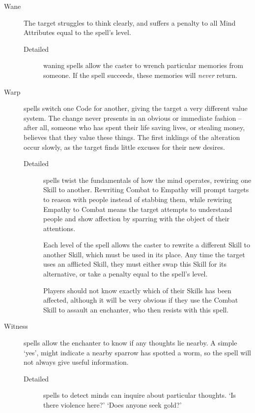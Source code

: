 \begin{multicols}{2}
\begin{description}
  \item[Wane]
    The target struggles to think clearly, and suffers a penalty to all Mind Attributes equal to the spell's level.
    \begin{description}
      \item[Detailed]
        waning spells allow the caster to wrench particular memories from someone.
        If the spell succeeds, these memories will \emph{never} return.
    \end{description}
  \item[Warp]
    spells switch one Code for another, giving the target a very different value system.
    The change never presents in an obvious or immediate fashion -- after all, someone who has spent their life saving lives, or stealing money, believes that they value these things.
    The first inklings of the alteration occur slowly, as the target finds little excuses for their new desires.
    \begin{description}
      \item[Detailed]
        spells twist the fundamentals of how the mind operates, rewiring one Skill to another.
        Rewriting Combat to Empathy will prompt targets to reason with people instead of stabbing them, while rewiring Empathy to Combat means the target attempts to understand people and show affection by sparring with the object of their attentions.

        Each level of the spell allows the caster to rewrite a different Skill to another Skill, which must be used in its place.
        Any time the target uses an afflicted Skill, they must either swap this Skill for its alternative, or take a penalty equal to the spell's level.

        Players should not know exactly which of their Skills has been affected, although it will be very obvious if they use the Combat Skill to assault an enchanter, who then resists with this spell.
    \end{description}
  \item[Witness]
    spells allow the enchanter to know if any thoughts lie nearby.
    A simple `yes', might indicate a nearby sparrow has spotted a worm, so the spell will not always give useful information.
    \begin{description}
      \item[Detailed]
        spells to detect minds can inquire about particular thoughts.
        `Is there violence here?'
        `Does anyone seek gold?'
    \end{description}
\end{description}


\end{multicols}
